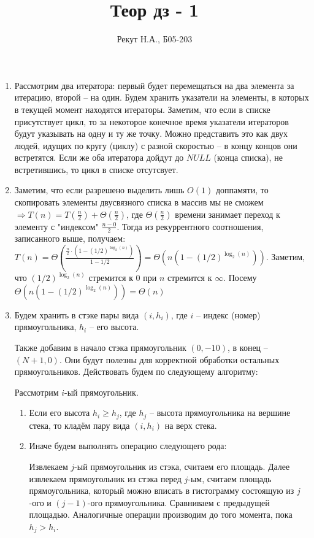\documentclass{article}
\title{Теор дз - 1}
\author{Рекут Н.А., Б05-203}
\begin{document}
\maketitle

\begin{enumerate}

\item Рассмотрим два итератора: первый будет перемещаться на два элемента за итерацию, второй -- на один. Будем хранить указатели на элементы, в которых в текущей момент находятся итераторы. Заметим, что если в списке присутствует цикл, то за некоторое конечное время указатели итераторов будут указывать на одну и ту же точку. Можно представить это как двух людей, идущих по кругу (циклу) с разной скоростью -- в концу концов они встретятся. Если же оба итератора дойдут до $NULL$ (конца списка), не встретившись, то цикл в списке отсутсвует.


\item Заметим, что если разрешено выделить лишь $O(1)$ доппамяти, то скопировать элементы двусвязного списка в массив мы не сможем $\Rightarrow T(n) = T(\frac{n}{2}) + \Theta(\frac{n}{2})$, где $\Theta(\frac{n}{2})$ времени занимает переход к элементу с "индексом" $\frac{n - 0}{2}$. Тогда из рекуррентного соотношения, записанного выше, получаем: $T(n) = \Theta(\frac{\frac{n}{2} \cdot (1 - (1/2)^{\log_{2}(n)})}{1 - 1/2}) = \Theta (n(1 - (1/2)^{\log_{2}(n)}))$. Заметим, что $(1/2)^{\log_{2}(n)}$ стремится к 0 при $n$ стремится к $\infty$. Посему $\Theta (n(1 - (1/2)^{\log_{2}(n)})) = \Theta (n)$

\item Будем хранить в стэке пары вида $(i, h_i)$, где $i$ -- индекс (номер) прямоугольника, $h_i$ -- его высота.

Также добавим в начало стэка прямоугольник $(0, -10)$, в конец -- $(N+1, 0)$. Они будут полезны для корректной обработки остальных прямоугольников. Действовать будем по следующему алгоритму:

Рассмотрим $i$-ый прямоугольник. 

\begin{enumerate}
    \item Если его высота $h_i \geq h_j$, где $h_j$ -- высота прямоугольника на вершине стека, то кладём пару вида $(i, h_i)$ на верх стека.
    
    \item Иначе будем выполнять операцию следующего рода:
    
    Извлекаем $j$-ый прямоугольник из стэка, считаем его площадь. Далее извлекаем прямоугольник из стэка перед $j$-ым, считаем площадь прямоугольника, который можно вписать в гистограмму состоящую из $j$-ого и $(j-1)$-ого прямоугольника. Сравниваем с предыдущей площадью. Аналогичные операции производим до того момента, пока $h_j > h_i$.
    

\end{enumerate}
\end{enumerate}
\end{document}
